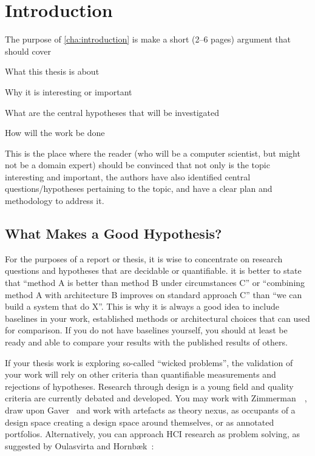 \chapter{Introduction}
\label{cha:introduction}

The purpose of \autoref{cha:introduction} is make a short (2--6 pages)
argument that should cover
\begin{aenumerate}
\item What this thesis is about
\item Why it is interesting or important
\item What are the central hypotheses that will be investigated 
\item How will the work be done
\end{aenumerate}

This is the place where the reader (who will be a computer scientist, but
might not be a domain expert) should be convinced that not only is the topic
interesting and important, the authors have also identified central
questions/hypotheses pertaining to the topic, and have a clear plan and
methodology to address it.

\section{What Makes a Good Hypothesis?}
\label{sec:what-makes-good}

For the purposes of a report or thesis, it is wise to concentrate on
research questions and hypotheses that are decidable or quantifiable. \Eg it
is better to state that ``method A is better than method B under
circumstances C'' or ``combining method A with architecture B improves on
standard approach C'' than ``we can build a system that do X''.  This is why
it is always a good idea to include baselines in your work, \ie established
methods or architectural choices that can used for comparison. If you do not
have baselines yourself, you should at least be ready and able to compare
your results with the published results of others.

If your thesis work is exploring so-called ``wicked problems'', the validation
of your work will rely on other criteria than quantifiable measurements and
rejections of hypotheses.  Research through design is a young field and
quality criteria are currently debated and developed. You may work with
Zimmerman~\etal~\cite{Zimmerman2007:POTSCOHFICS2007}, draw upon
Gaver~\cite{Gaver2012:POTSCOHFICS2012} and work with artefacts as theory
nexus, as occupants of a design space creating a design space around
themselves, or as annotated portfolios. Alternatively, you can approach HCI
research as problem solving, as suggested by Oulasvirta and
Hornbæk~\cite{Oulasvirta2016:POT2CCOHFICS2016}:

